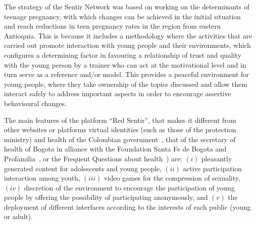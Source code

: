 \documentclass[journal,transmag]{IEEEtran}
\begin{document}

The strategy of the Sentir Network was based on working on the determinants of teenage pregnancy, with which changes can be achieved in the initial situation and reach reductions in teen pregnancy rates in the region from eastern Antioquia. This is because it includes a methodology where the activities that are carried out promote interaction with young people and their environments, which configures a determining factor in favouring a relationship of trust and quality with the young person by a trainer who can act at the motivational level and in turn serve as a reference and/or model. This provides a peaceful environment for young people, where they take ownership of the topics discussed and allow them interact safely to address important aspects in order to encourage assertive behavioural changes. 

%

The main features of the platform ``Red Sentir'', that makes it different from other websites or platforms virtual identities (such as those of the protection ministry) and health of the Colombian government~\cite{PagGob2018}, that of the secretary of health of Bogota in alliance with the Foundation Santa Fe de Bogota and Profamilia~\cite{Sexperto2018}, or the Frequent Questions about health~\cite{1DOC3}) are: $(i)$ pleasantly generated content for adolescents and young people, $(ii)$ active participation interaction among youth, $(iii)$ video games for the compression of sexuality, $(iv)$ discretion of the environment to encourage the participation of young people by offering the possibility of participating anonymously, and $(v)$ the deployment of different interfaces according to the interests of each public (young or adult).
\end{document}
